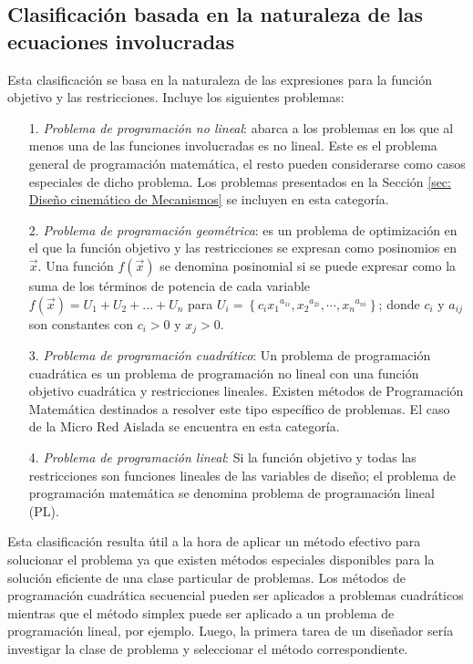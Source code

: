 \subsection{Clasificación basada en la naturaleza de las ecuaciones involucradas} 
Esta clasificación se basa en la naturaleza de las expresiones para la función objetivo y las restricciones.  Incluye los siguientes problemas: 
\begin{itemize}
\item [1.] \textit{Problema de programación no lineal}: abarca a los problemas en los que al menos una de las funciones involucradas es no lineal. Este es el problema general de programación matemática, el resto  pueden considerarse como casos especiales de dicho problema. Los problemas presentados en la Sección \ref{sec: Diseño cinemático de Mecanismos} se incluyen en esta categoría.
\item[2.]\textit{Problema de programación geométrica}: es un problema de optimización en el que la función objetivo y las restricciones se expresan como posinomios en $\vec{x}$. Una función $f(\vec{x})$ se denomina posinomial si se puede expresar como la suma de los términos de potencia de cada variable $f(\vec{x})=U_1 + U_2+ ...+U_n$ para  $U_i=\left\lbrace c_i{x_1}^{a_{1i}}, {x_2}^{a_{2i}}, \cdots, {x_n}^{a_{ni}}\right\rbrace $; donde $c_i$ y $a_{ij}$ son constantes con $c_i> 0$ y $x_j> 0$.
\item[3.] \textit{Problema de programación cuadrático}: Un problema de programación cuadrática es un problema de programación no lineal con una función objetivo cuadrática y restricciones lineales. Existen métodos de Programación Matemática destinados a resolver este tipo específico de problemas. El caso de la Micro Red Aislada se encuentra en esta categoría.
\item[4.] \textit{Problema de programación lineal}: Si la función objetivo y todas las restricciones son funciones lineales de las variables de diseño; el problema de programación matemática se denomina problema de programación lineal (PL).
\end{itemize}
Esta clasificación resulta útil a la hora de aplicar un método efectivo para solucionar el problema ya que existen  métodos especiales disponibles para la solución eficiente de una clase particular de problemas. Los métodos de programación cuadrática secuencial pueden ser aplicados a problemas cuadráticos mientras que el método simplex puede ser aplicado a un problema de programación lineal, por ejemplo. Luego, la primera tarea de un diseñador sería investigar la clase de problema y seleccionar el método correspondiente.

